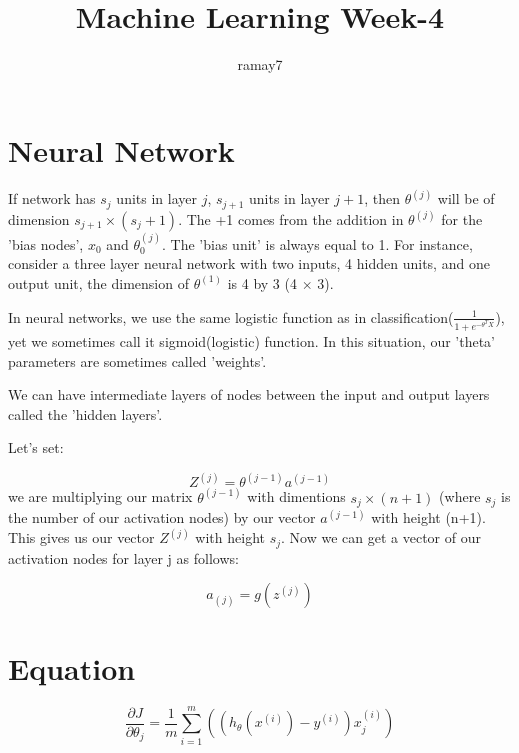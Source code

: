 \documentclass[11pt]{article}
\begin{document}
	\title{Machine Learning Week-4}
	\author{ramay7}
	
	\maketitle %
	\tableofcontents %
	
	\section{Neural Network}
		If network has $s_j$ units in layer $j$, $s_{j+1}$ units in layer $j+1$, then $\theta^{(j)}$ will be of dimension $s_{j+1} \times (s_j + 1)$. The +1 comes from the addition in $\theta^{(j)}$ for the 'bias nodes', $x_0$ and $\theta_{0}^{(j)}$. The 'bias unit' is always equal to 1. For instance, consider a three layer neural network with two inputs, 4 hidden units, and one output unit, the dimension of $\theta^{(1)}$ is 4 by 3 (4 $\times$ 3).
		
		In neural networks, we use the same logistic function as in classification($\frac{1}{1+e^{-\theta^{T}X}}$), yet we sometimes call it sigmoid(logistic) function. In this situation, our 'theta' parameters are sometimes called 'weights'.
		
		We can have intermediate layers of nodes between the input and output layers called the 'hidden layers'.
		
		Let's set:
		
		$$Z^{(j)} = \theta^{(j-1)}a^{(j-1)}$$
		we are multiplying our matrix $\theta^{(j-1)}$ with dimentions $s_j \times (n+1)$ (where $s_j$ is the number of our activation nodes) by our vector $a^{(j-1)}$ with height (n+1). This gives us our vector $Z^{(j)}$ with height $s_j$. Now we can get a vector of our activation nodes for layer j as follows:
		
		$$a_{(j)} = g(z^{(j)})$$
		
	\section{Equation}
		
		$$
		\frac{\partial J}{\partial \theta_j} = \frac{1}{m} \sum_{i=1}^{m}((h_{\theta}(x^{(i)}) - y^{(i)})x_{j}^{(i)})
		$$
		
\end{document}
